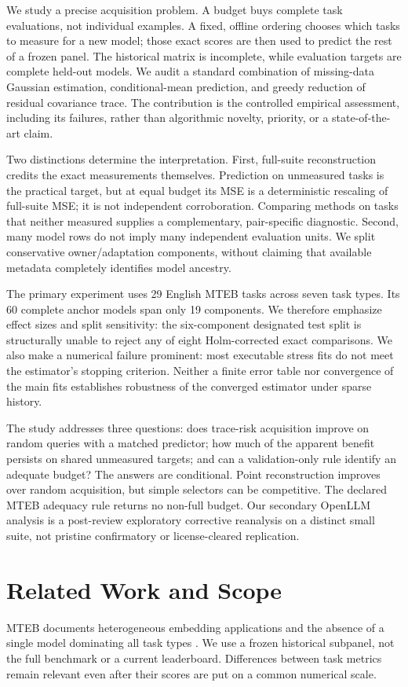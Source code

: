 \documentclass{article}
\begin{document}
We study a precise acquisition problem. A budget buys complete task evaluations, not individual examples. A fixed, offline ordering chooses which tasks to measure for a new model; those exact scores are then used to predict the rest of a frozen panel. The historical matrix is incomplete, while evaluation targets are complete held-out models. We audit a standard combination of missing-data Gaussian estimation, conditional-mean prediction, and greedy reduction of residual covariance trace. The contribution is the controlled empirical assessment, including its failures, rather than algorithmic novelty, priority, or a state-of-the-art claim.

Two distinctions determine the interpretation. First, full-suite reconstruction credits the exact measurements themselves. Prediction on unmeasured tasks is the practical target, but at equal budget its MSE is a deterministic rescaling of full-suite MSE; it is not independent corroboration. Comparing methods on tasks that neither measured supplies a complementary, pair-specific diagnostic. Second, many model rows do not imply many independent evaluation units. We split conservative owner/adaptation components, without claiming that available metadata completely identifies model ancestry.

The primary experiment uses 29 English MTEB tasks across seven task types. Its 60 complete anchor models span only 19 components. We therefore emphasize effect sizes and split sensitivity: the six-component designated test split is structurally unable to reject any of eight Holm-corrected exact comparisons. We also make a numerical failure prominent: most executable stress fits do not meet the estimator's stopping criterion. Neither a finite error table nor convergence of the main fits establishes robustness of the converged estimator under sparse history.

The study addresses three questions: does trace-risk acquisition improve on random queries with a matched predictor; how much of the apparent benefit persists on shared unmeasured targets; and can a validation-only rule identify an adequate budget? The answers are conditional. Point reconstruction improves over random acquisition, but simple selectors can be competitive. The declared MTEB adequacy rule returns no non-full budget. Our secondary OpenLLM analysis is a post-review exploratory corrective reanalysis on a distinct small suite, not pristine confirmatory or license-cleared replication.

\section{Related Work and Scope}
\label{sec:related}
MTEB documents heterogeneous embedding applications and the absence of a single model dominating all task types \citep{muennighoff2022mteb}. We use a frozen historical subpanel, not the full benchmark or a current leaderboard. Differences between task metrics remain relevant even after their scores are put on a common numerical scale.
\end{document}
